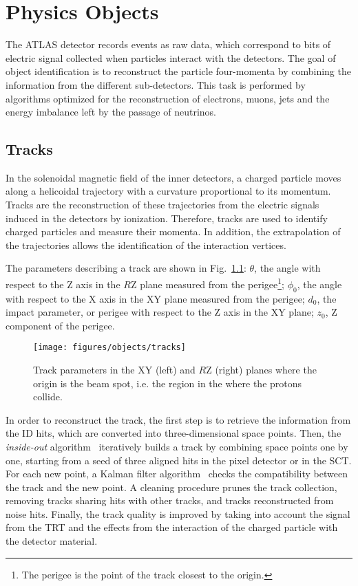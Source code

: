 \chapter{Physics Objects}
\label{sec:objects}

The ATLAS detector records events as raw data, 
which correspond to bits of electric signal collected 
when particles interact with the detectors. 
The goal of object identification is to reconstruct the particle
four-momenta by combining the information from the different
sub-detectors. This task is performed by algorithms optimized for the
reconstruction of electrons, muons, jets and the energy imbalance left
by the passage of neutrinos. 

\section{Tracks}
\label{sec:tracks}

In the solenoidal magnetic field of the inner detectors,
a charged particle moves along a helicoidal trajectory with a 
curvature proportional to its momentum.
Tracks are the reconstruction of these trajectories from the electric 
signals induced in the detectors by ionization.
Therefore, tracks are used to identify charged particles and measure
their momenta. In addition, the extrapolation of the trajectories
allows the identification of the interaction vertices.
 
The parameters describing a track are shown in
Fig.~\ref{fig:trackpar}: $\theta$, the angle with respect to the Z axis in the
$R$Z plane measured from the perigee\footnote{The perigee is the point
  of the track closest to the origin.}; $\phi_0$, the angle with
respect to the X axis in the XY plane measured from the perigee;
$d_0$, the impact parameter, or perigee with respect to the Z axis in
the XY plane; $z_0$, Z component of the perigee. 

\begin{figure}[htb!]
  \centering
  \texttt{[image: figures/objects/tracks]}
  \caption{Track parameters in the XY (left) and $R$Z (right) planes
    where the origin is the beam spot, i.e. the region in the where
    the protons collide. 
    \label{fig:trackpar}}
\end{figure}

In order to reconstruct the track, the first step is to retrieve the
information from the ID hits, which are converted into
three-dimensional space points. Then, the {\it inside-out}
algorithm~\cite{insideoutalgo}  iteratively builds a track by
combining space points one by one, starting from a seed of three
aligned hits in the pixel detector or in the SCT. 
For each new point, a Kalman filter algorithm~\cite{kalmanfilter}
checks the compatibility between the track and the new point. 
A cleaning procedure prunes the track collection, removing 
tracks sharing hits with other tracks, and tracks reconstructed from
noise hits. 
Finally, the track quality is improved by taking into account the
signal from the TRT and the effects from the interaction of the
charged particle with the detector material. 

